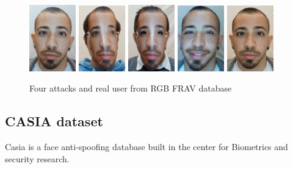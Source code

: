 \begin{figure}[htb]
\centering
\includegraphics[width=0.18\textwidth]{images_databases/fravrgb/at1-1.JPG}
\includegraphics[width=0.18\textwidth]{images_databases/fravrgb/at2-1.JPG}
\includegraphics[width=0.18\textwidth]{images_databases/fravrgb/at3-1.JPG}
\includegraphics[width=0.18\textwidth]{images_databases/fravrgb/at4-1.JPG}
\includegraphics[width=0.18\textwidth]{images_databases/fravrgb/real1.JPG}

\caption{Four attacks and real user from RGB FRAV database } \label{fig:RGB-frav2}
\end{figure}

\subsection{CASIA dataset}
Casia is a face anti-spoofing database built in the center for Biometrics and security research.\\

